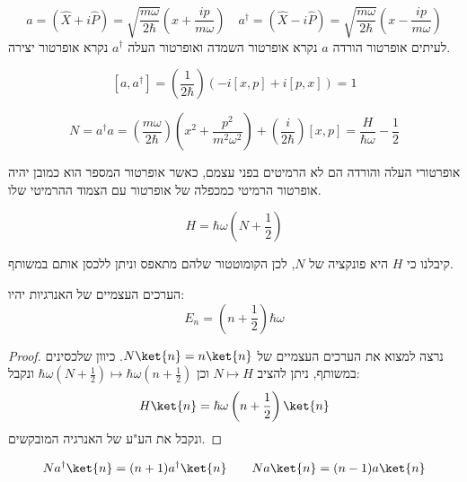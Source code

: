 \documentclass{tstextbook}
\begin{document}
\begin{definition}
$$a=\left( \hat{X}+i\hat{P} \right)=\sqrt{\frac{m\omega}{2\hbar}}\left(x+\frac{i p}{m\omega}\right)\quad a^{\dagger}=\left( \hat{X}-i\hat{P} \right)=\sqrt{\frac{m\omega}{2\hbar}}\left(x-\frac{i p}{m\omega}\right)$$
לעיתים אופרטור הורדה \(a\) נקרא אופרטור השמדה ואופרטור העלה \(a^{\dagger}\) נקרא אופרטור יצירה.

\end{definition}
\begin{proposition}
$$\left[a,a^{\dagger}\right]=\left(\frac{1}{2\hbar}\right)\left(-i[x,p]+i[p,x]\right)=1$$

\end{proposition}
\begin{definition}
$$N=a^{\dagger}a=\left(\frac{m\omega}{2\hbar}\right)\left(x^{2}+\frac{p^{2}}{m^{2}\omega^{2}}\right)+\left(\frac{i}{2\hbar}\right)[x,p]=\frac{H}{\hbar \omega}-\frac{1}{2}$$

\end{definition}
\begin{remark}
אופרטורי העלה והורדה הם לא הרמיטים בפני עצמם, כאשר אופרטור המספר הוא כמובן יהיה אופרטור הרמיטי כמכפלה של אופרטור עם הצמוד ההרמיטי שלו.

\end{remark}
\begin{proposition}
$$H=\hbar\omega(N+\frac{1}{2})$$

\end{proposition}
\begin{corollary}
קיבלנו כי \(H\) היא פונקציה של \(N\), לכן הקומוטטור שלהם מתאפס וניתן ללכסן אותם במשותף.

\end{corollary}
\begin{proposition}
הערכים העצמיים של האנרגיות יהיו:
$$E_{n}=\left( n+{{\frac{1}{2}}} \right)\hbar\omega$$

\end{proposition}
\begin{proof}
נרצה למצוא את הערכים העצמיים של \(N\ket{n}=n\ket{n}\). כיוון שלכסינים במשותף, ניתן להציב \(N\mapsto H\) וכן \(\hbar \omega \left( N+\frac{1}{2} \right)\mapsto \hbar \omega\left( n+\frac{1}{2} \right)\) ונקבל:
$$H\ket{n} =\hbar \omega\left( n+\frac{1}{2} \right)\ket{n} $$
ונקבל את הע"ע של האנרגיה המובקשים.

\end{proof}
\begin{proposition}
$$Na^{\dagger}\ket{ n} =(n+1)a^{\dagger}\ket{n} \qquad Na\ket{n} =(n-1)a\ket{n} $$

\end{proposition}
\end{document}
